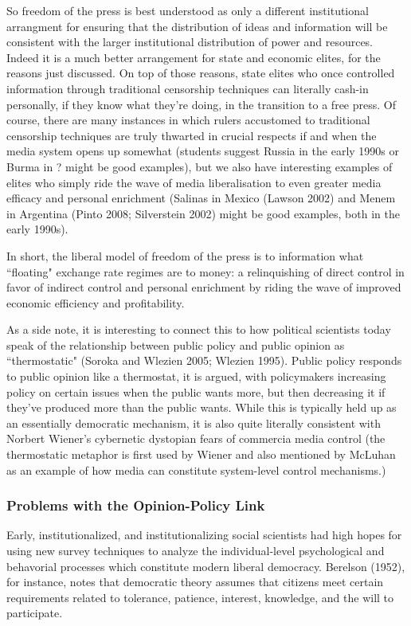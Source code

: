 \documentclass[12pt,book]{article}
\begin{document}
So freedom of the press is best understood as only a different
institutional arrangment for ensuring that the distribution of ideas and
information will be consistent with the larger institutional
distribution of power and resources. Indeed it is a much better
arrangement for state and economic elites, for the reasons just
discussed. On top of those reasons, state elites who once controlled
information through traditional censorship techniques can literally
cash-in personally, if they know what they're doing, in the transition
to a free press. Of course, there are many instances in which rulers
accustomed to traditional censorship techniques are truly thwarted in
crucial respects if and when the media system opens up somewhat
(students suggest Russia in the early 1990s or Burma in ? might be good
examples), but we also have interesting examples of elites who simply
ride the wave of media liberalisation to even greater media efficacy and
personal enrichment (Salinas in Mexico (Lawson 2002) and Menem in
Argentina (Pinto 2008; Silverstein 2002) might be good examples, both in
the early 1990s).

In short, the liberal model of freedom of the press is to information
what ``floating" exchange rate regimes are to money: a relinquishing of
direct control in favor of indirect control and personal enrichment by
riding the wave of improved economic efficiency and profitability.

As a side note, it is interesting to connect this to how political
scientists today speak of the relationship between public policy and
public opinion as ``thermostatic" (Soroka and Wlezien 2005; Wlezien
1995). Public policy responds to public opinion like a thermostat, it is
argued, with policymakers increasing policy on certain issues when the
public wants more, but then decreasing it if they've produced more than
the public wants. While this is typically held up as an essentially
democratic mechanism, it is also quite literally consistent with Norbert
Wiener's cybernetic dystopian fears of commercia media control (the
thermostatic metaphor is first used by Wiener and also mentioned by
McLuhan as an example of how media can constitute system-level control
mechanisms.)

\subsubsection{Problems with the Opinion-Policy
Link}\label{problems-with-the-opinion-policy-link}

Early, institutionalized, and institutionalizing social scientists had
high hopes for using new survey techniques to analyze the
individual-level psychological and behavorial processes which constitute
modern liberal democracy. Berelson (1952), for instance, notes that
democratic theory assumes that citizens meet certain requirements
related to tolerance, patience, interest, knowledge, and the will to
participate.
\end{document}
